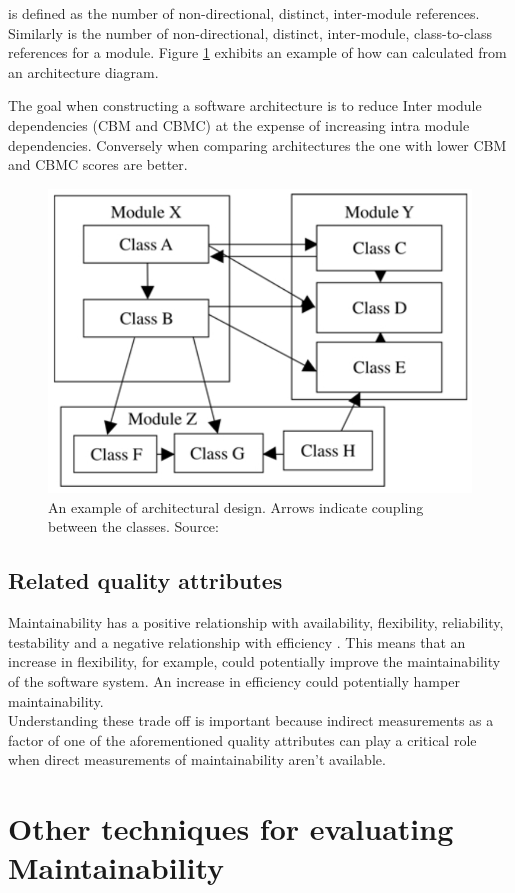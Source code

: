 \documentclass[dvips,12pt]{article}
\begin{document}
 is defined as the number of non-directional, distinct, inter-module references. Similarly  is the number of non-directional, distinct, inter-module, class-to-class references for a module. Figure \ref{fig:coupling} exhibits an example of how  can calculated from an architecture diagram.

The goal when constructing a software architecture is to reduce Inter module dependencies (CBM and CBMC) at the expense of increasing intra module dependencies. Conversely when comparing architectures the one with lower CBM and CBMC scores are better.

\begin{figure}
\includegraphics[width=0.5\linewidth]{./coupling}
\caption{An example of architectural design. Arrows indicate coupling between the classes. Source: \cite{lindvall_empirically-based_2003}}
\label{fig:coupling}
\end{figure}


\subsection{Related quality attributes}
Maintainability has a positive relationship with availability, flexibility, reliability, testability and a negative relationship with efficiency \cite{karl_software_2003}. This means that an increase in flexibility, for example, could potentially improve the maintainability of the software system. An increase in efficiency could potentially hamper maintainability.\\

Understanding these trade off is important because indirect measurements as a factor of one of the aforementioned quality attributes can play a critical role when direct measurements of maintainability aren't available.

\section{Other techniques for evaluating Maintainability}
\end{document}
